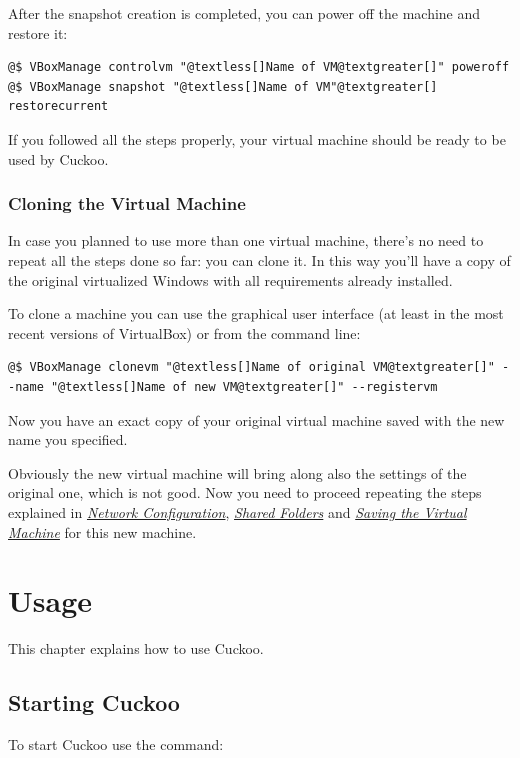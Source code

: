 \documentclass[letterpaper,10pt,english]{sphinxmanual}
\begin{document}
After the snapshot creation is completed, you can power off the machine and
restore it:

\begin{Verbatim}[commandchars=@\[\]]
@$ VBoxManage controlvm "@textless[]Name of VM@textgreater[]" poweroff
@$ VBoxManage snapshot "@textless[]Name of VM"@textgreater[] restorecurrent
\end{Verbatim}

If you followed all the steps properly, your virtual machine should be ready to
be used by Cuckoo.


\subsubsection{Cloning the Virtual Machine}
\label{installation/guest/cloning:cloning-the-virtual-machine}\label{installation/guest/cloning::doc}
In case you planned to use more than one virtual machine, there's no need to
repeat all the steps done so far: you can clone it. In this way you'll have
a copy of the original virtualized Windows with all requirements already
installed.

To clone a machine you can use the graphical user interface (at least in the
most recent versions of VirtualBox) or from the command line:

\begin{Verbatim}[commandchars=@\[\]]
@$ VBoxManage clonevm "@textless[]Name of original VM@textgreater[]" --name "@textless[]Name of new VM@textgreater[]" --registervm
\end{Verbatim}

Now you have an exact copy of your original virtual machine saved with the new
name you specified.

Obviously the new virtual machine will bring along also the settings of the
original one, which is not good. Now you need to proceed repeating the steps
explained in {\hyperref[installation/guest/network::doc]{\emph{Network Configuration}}}, {\hyperref[installation/guest/shares::doc]{\emph{Shared Folders}}} and {\hyperref[installation/guest/saving::doc]{\emph{Saving the Virtual Machine}}} for this new
machine.


\section{Usage}
\label{usage/index:usage}\label{usage/index::doc}
This chapter explains how to use Cuckoo.


\subsection{Starting Cuckoo}
\label{usage/start::doc}\label{usage/start:starting-cuckoo}
To start Cuckoo use the command:
\end{document}
